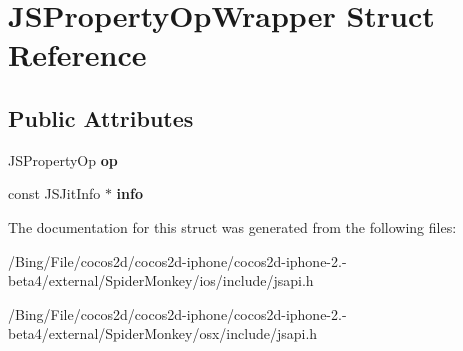 \hypertarget{struct_j_s_property_op_wrapper}{\section{J\-S\-Property\-Op\-Wrapper Struct Reference}
\label{struct_j_s_property_op_wrapper}
}
\subsection*{Public Attributes}
\begin{DoxyCompactItemize}
\item 
\hypertarget{struct_j_s_property_op_wrapper_af43861b15d0ab0cc65eb0005802f650d}{J\-S\-Property\-Op {\bfseries op}}\label{struct_j_s_property_op_wrapper_af43861b15d0ab0cc65eb0005802f650d}

\item 
\hypertarget{struct_j_s_property_op_wrapper_a8ccda6d6a497b4c2c08f2f0a2ed5a9fb}{const J\-S\-Jit\-Info $\ast$ {\bfseries info}}\label{struct_j_s_property_op_wrapper_a8ccda6d6a497b4c2c08f2f0a2ed5a9fb}

\end{DoxyCompactItemize}


The documentation for this struct was generated from the following files\-:\begin{DoxyCompactItemize}
\item 
/\-Bing/\-File/cocos2d/cocos2d-\/iphone/cocos2d-\/iphone-\/2.-\/beta4/external/\-Spider\-Monkey/ios/include/jsapi.\-h\item 
/\-Bing/\-File/cocos2d/cocos2d-\/iphone/cocos2d-\/iphone-\/2.-\/beta4/external/\-Spider\-Monkey/osx/include/jsapi.\-h\end{DoxyCompactItemize}
